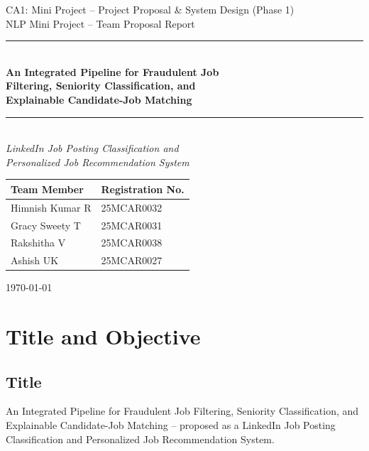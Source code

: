 \documentclass[11pt,a4paper]{article}
\begin{document}
\begin{titlepage}
\centering
\vspace*{1.0cm}

{\large CA1: Mini Project -- Project Proposal \& System Design (Phase 1)}\\[0.3cm]
{\large NLP Mini Project -- Team Proposal Report}\\[1.2cm]

\rule{\linewidth}{0.6pt}\\[0.4cm]
{\Huge\bfseries\color{navy} An Integrated Pipeline for Fraudulent Job \\[0.2cm] Filtering, Seniority Classification, and \\[0.2cm] Explainable Candidate-Job Matching}\\[0.5cm]
\rule{\linewidth}{0.6pt}\\[1.2cm]

{\large\itshape LinkedIn Job Posting Classification and\\ Personalized Job Recommendation System}\\[2cm]

\begin{tabular}{ll}
\toprule
\textbf{Team Member} & \textbf{Registration No.} \\
\midrule
Himnish Kumar R & 25MCAR0032 \\
Gracy Sweety T  & 25MCAR0031 \\
Rakshitha V     & 25MCAR0038 \\
Ashish UK       & 25MCAR0027 \\
\bottomrule
\end{tabular}

\vfill

{\large \today}

\end{titlepage}

\clearpage
\tableofcontents
\clearpage

\section{Title and Objective}
\label{sec:objective}

\subsection*{Title}
An Integrated Pipeline for Fraudulent Job Filtering, Seniority Classification, and
Explainable Candidate-Job Matching -- proposed as a LinkedIn Job Posting Classification
and Personalized Job Recommendation System.
\end{document}
